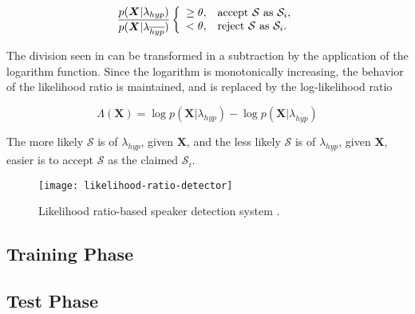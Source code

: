 \begin{equation}
    \frac{p(\boldsymbol{X}|\lambda_{hyp})}{p(\boldsymbol{X}|\lambda_{\overline{hyp}})} \verifytest{\theta}{\mathcal{S} \text{ as } \mathcal{S}_i}
    \label{eq:likelihood-ratio-test-3}
\end{equation}

The division seen in  can be transformed in a subtraction by the application of the logarithm function. Since the logarithm is monotonically increasing, the behavior of the likelihood ratio is maintained, and  is replaced by the log-likelihood ratio

\begin{equation}
    \Lambda(\boldsymbol{X}) = \log p(\boldsymbol{X}|\lambda_{hyp}) - \log p(\boldsymbol{X}|\lambda_{\overline{hyp}})
    \label{eq:log-likelihood-ratio}
\end{equation}

\noindent The more likely $\mathcal{S}$ is of $\lambda_{hyp}$, given $\boldsymbol{X}$, and the less likely $\mathcal{S}$ is of $\lambda_{\underline{hyp}}$, given $\boldsymbol{X}$, easier is to accept $\mathcal{S}$ as the claimed $\mathcal{S}_i$.

\begin{figure}[ht]
    \centering
    \texttt{[image: likelihood-ratio-detector]}
    \caption{Likelihood ratio-based speaker detection system \cite{bimbot.et.al.2004}.}
    \label{fig:likelihood-ratio-detector}
\end{figure}

\subsection{Training Phase}

\subsection{Test Phase}